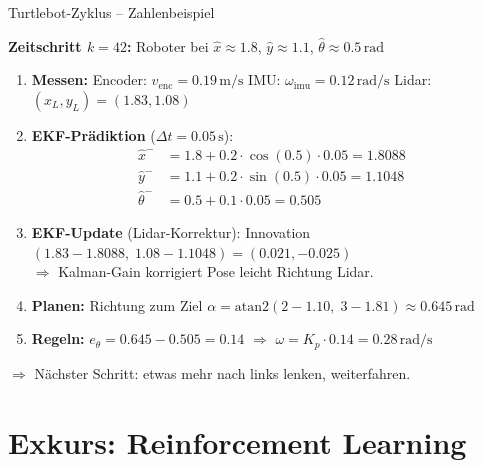 \documentclass[%
  aspectratio=169,
  10pt
]{beamer}
\begin{document}
\begin{frame}{Turtlebot-Zyklus -- Zahlenbeispiel}

\textbf{Zeitschritt $k=42$:} Roboter bei $\hat{x} \approx 1.8$, $\hat{y} \approx 1.1$, $\hat{\theta} \approx 0.5\,\text{rad}$

\vspace{2mm}
\begin{enumerate}
  \item \textbf{Messen:}
        Encoder: $v_\mathrm{enc} = 0.19\,\text{m/s}$ \;
        IMU: $\omega_\mathrm{imu} = 0.12\,\text{rad/s}$ \;
        Lidar: $(x_L, y_L) = (1.83, 1.08)$

  \item \textbf{EKF-Prädiktion} ($\Delta t = 0.05\,\text{s}$):
        \begin{align*}
          \hat{x}^- &= 1.8 + 0.2 \cdot \cos(0.5) \cdot 0.05 = 1.8088 \\[-1mm]
          \hat{y}^- &= 1.1 + 0.2 \cdot \sin(0.5) \cdot 0.05 = 1.1048 \\[-1mm]
          \hat{\theta}^- &= 0.5 + 0.1 \cdot 0.05 = 0.505
        \end{align*}

  \item \textbf{EKF-Update} (Lidar-Korrektur):
        Innovation $(1.83 - 1.8088,\; 1.08 - 1.1048) = (0.021, -0.025)$ \\
        $\Rightarrow$ Kalman-Gain korrigiert Pose leicht Richtung Lidar.

  \item \textbf{Planen:} Richtung zum Ziel
        $\alpha = \mathrm{atan2}(2 - 1.10,\; 3 - 1.81) \approx 0.645\,\text{rad}$

  \item \textbf{Regeln:}
        $e_\theta = 0.645 - 0.505 = 0.14$ \;$\Rightarrow$\;
        $\omega = K_p \cdot 0.14 = 0.28\,\text{rad/s}$
\end{enumerate}

$\Rightarrow$ Nächster Schritt: etwas mehr nach links lenken, weiterfahren.

\end{frame}


\section*{Exkurs: Reinforcement Learning}
\end{document}
